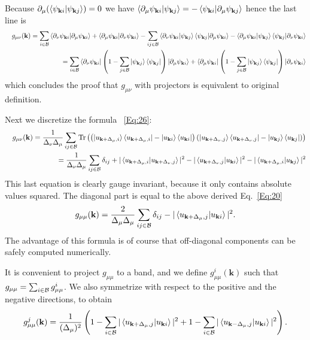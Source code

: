\documentclass[onecolumn, prb,preprintnumbers,amsmath,amssymb,floatfix]{revtex4}
\newcommand{\vk}{{\mathbf{k}}}
\newcommand{\Tr}{\mathrm{Tr}} \newcommand{\npsi}{\underline{\psi}}
\newcommand{\cb}{{\cal B}}
\begin{document}
Because $\partial_\mu (\braket{\psi_{\vk i}|\psi_{\vk j}})=0$ we have
$\braket{\partial_\mu\psi_{\vk i}|\psi_{\vk j}}=-\braket{\psi_{\vk i}|\partial_\mu\psi_{\vk j}}$
hence the last line is
\begin{eqnarray}
  &&  g_{\mu\nu}(\vk)  =\sum_{i\in\cb}   \braket{\partial_\nu\psi_{\vk i}|\partial_\mu \psi_{\vk i}}+\braket{\partial_\mu \psi_{\vk i}|\partial_\nu \psi_{\vk i}}
-\sum_{ij\in\cb}\braket{\partial_\nu\psi_{\vk i} | \psi_{\vk j}}\braket{\psi_{\vk j}|\partial_\mu \psi_{\vk i}}
-\braket{\partial_\mu \psi_{\vk i}|\psi_{\vk j}}\braket{\psi_{\vk j}|\partial_\nu\psi_{\vk i}}\\
  &&=\sum_{i\in\cb}
     \braket{\partial_\nu\psi_{\vk i}|\left(1-\sum_{j\in\cb} \ket{\psi_{\vk j}}\bra{\psi_{\vk j}}\right)|\partial_\mu \psi_{\vk i}}
   +\braket{\partial_\mu \psi_{\vk i}|\left(1-\sum_{j\in\cb}\ket{\psi_{\vk j}}\bra{\psi_{\vk j}}\right)|\partial_\nu \psi_{\vk i}}
\end{eqnarray}     
which concludes the proof that $g_{\mu\nu}$ with projectors is
equivalent to original definition.

Next we discretize the formula ~\ref{Eq:26}:
\begin{eqnarray}
&&g_{\mu\nu}(\vk)  =  \frac{1}{\Delta_\nu\Delta_\mu}\sum_{i j \in\cb}\Tr\left(
  \left(\ket{u_{\vk+\Delta_\mu, i}}\bra{u_{\vk+\Delta_\mu, i}}-\ket{u_{\vk i}}\bra{u_{\vk i}}\right)
  \left(\ket{u_{\vk+\Delta_\nu,j}}\bra{u_{\vk+\Delta_\nu,j}} -\ket{u_{\vk j}}\bra{u_{\vk j}}\right)
  \right)\\
  &&=  \frac{1}{\Delta_\nu\Delta_\mu}\sum_{i j \in\cb}
     \delta_{ij}+
    |\braket{u_{\vk+\Delta_\mu, i}|u_{\vk+\Delta_\nu,j}}|^2
   -|\braket{u_{\vk+\Delta_\nu,j}|u_{\vk i}}|^2 
   -|\braket{u_{\vk+\Delta_\mu, i}|u_{\vk j}}|^2
\end{eqnarray}
This last equation is clearly gauge invariant, because it only
contains absolute values squared. The diagonal part is
equal to the above derived Eq.~\ref{Eq:20}
\begin{eqnarray}
  g_{\mu\mu}(\vk)  =\frac{2}{\Delta_\mu\Delta_\mu}\sum_{i j \in\cb}
\delta_{ij}-|\braket{u_{\vk+\Delta_\mu,j}|u_{\vk i}}|^2 .
\end{eqnarray}
The advantage of this formula is of course that off-diagonal
components can be safely computed numerically.

It is convenient to project $g_{\mu\mu}$ to a band, and we define
$g^i_{\mu\mu}(\vk)$ such that
$g_{\mu\mu}=\sum_{i\in\cb}g_{\mu\mu}^i$. We also symmetrize with
respect to the positive and the negative directions, to obtain
\begin{eqnarray}
  g^j_{\mu\mu}(\vk)  =\frac{1}{(\Delta_\mu)^2}
  \left(1-\sum_{i\in\cb}|\braket{u_{\vk+\Delta_\mu,j}|u_{\vk i}}|^2+
          1-\sum_{i\in\cb}|\braket{u_{\vk-\Delta_\mu,j}|u_{\vk i}}|^2
  \right) .
\end{eqnarray}
\end{document}
